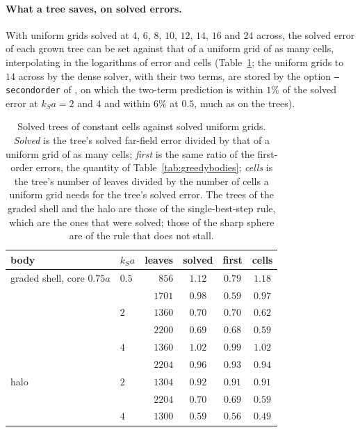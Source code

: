 \documentclass[11pt,a4paper]{article}
\begin{document}
\paragraph{What a tree saves, on solved errors.} With uniform grids solved at $4$, $6$, $8$, $10$, $12$,
$14$, $16$ and $24$ across, the solved error of each grown tree can be set against that of a uniform grid of
as many cells, interpolating in the logarithms of error and cells (Table~\ref{tab:treesolved}; the
uniform grids to $14$ across by the dense solver, with their two terms, are stored by the option
\texttt{--secondorder} of , on which the two-term
prediction is within $1\%$ of the solved error at $k_Sa=2$ and $4$ and within $6\%$ at $0.5$, much as on
the trees).
\begin{table}[htbp]
\centering
\caption{Solved trees of constant cells against solved uniform grids. \emph{Solved} is the tree's
solved far-field error divided by that of a uniform grid of as many cells; \emph{first} is the same
ratio of the first-order errors, the quantity of Table~\ref{tab:greedybodies}; \emph{cells} is the
tree's number of leaves divided by the number of cells a uniform grid needs for the tree's solved error.
The trees of the graded shell and the halo are those of the single-best-step rule, which are the ones
that were solved; those of the sharp sphere are of the rule that does not stall.}\label{tab:treesolved}
\small
\begin{tabular}{@{}llrccc@{}}
\toprule
body & $k_Sa$ & leaves & solved & first & cells \\
\midrule
graded shell, core $0.75a$ & $0.5$ & $856$  & $1.12$ & $0.79$ & $1.18$ \\
                           &       & $1701$ & $0.98$ & $0.59$ & $0.97$ \\
                           & $2$   & $1360$ & $0.70$ & $0.70$ & $0.62$ \\
                           &       & $2200$ & $0.69$ & $0.68$ & $0.59$ \\
                           & $4$   & $1360$ & $1.02$ & $0.99$ & $1.02$ \\
                           &       & $2204$ & $0.96$ & $0.93$ & $0.94$ \\
\midrule
halo                       & $2$   & $1304$ & $0.92$ & $0.91$ & $0.91$ \\
                           &       & $2204$ & $0.70$ & $0.69$ & $0.59$ \\
                           & $4$   & $1300$ & $0.59$ & $0.56$ & $0.49$ \\

\end{tabular}
\end{table}
\end{document}
